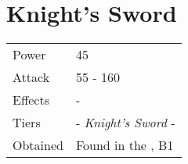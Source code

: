 \section{Knight's Sword}
\label{weapon:knights_sword}


\noindent\begin{tabularx}{\textwidth}[l]{lX}
	Power
	& 45
\\
	Attack
	& 55 - 160
\\
	Effects
	& -
\\
	Tiers
	& \nameref{weapon:steel_sword} - \textit{Knight's Sword} - \nameref{weapon:excalibur}
\\
	Obtained
	& Found in the \nameref{map:ice_pyramid}, B1
\end{tabularx}
